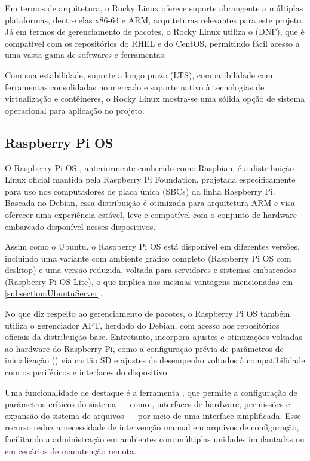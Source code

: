 Em termos de arquitetura, o Rocky Linux oferece suporte abrangente a múltiplas plataformas, dentre elas x86-64 e ARM, arquiteturas relevantes para este projeto. Já em termos de gerenciamento de pacotes, o Rocky Linux utiliza o  (DNF), que é compatível com os repositórios do RHEL e do CentOS, permitindo fácil acesso a uma vasta gama de softwares e ferramentas.

Com sua estabilidade, suporte a longo prazo (LTS), compatibilidade com ferramentas consolidadas no mercado e suporte nativo à tecnologias de virtualização e contêineres, o Rocky Linux mostra-se uma sólida opção de sistema operacional para aplicação no projeto.

\subsection{Raspberry Pi OS}
\label{subsection:RaspberryPiOS}

O Raspberry Pi OS \citep{raspisftwr2025}, anteriormente conhecido como Raspbian, é a distribuição Linux oficial mantida pela Raspberry Pi Foundation, projetada especificamente para uso nos computadores de placa única (SBCs) da linha Raspberry Pi. Baseada no Debian, essa distribuição é otimizada para arquitetura ARM e visa oferecer uma experiência estável, leve e compatível com o conjunto de hardware embarcado disponível nesses dispositivos.

Assim como o Ubuntu, o Raspberry Pi OS está disponível em diferentes versões, incluindo uma variante com ambiente gráfico completo (Raspberry Pi OS com desktop) e uma versão reduzida, voltada para servidores e sistemas embarcados (Raspberry Pi OS Lite), o que implica nas mesmas vantagens mencionadas em \ref{subsection:UbuntuServer}.

No que diz respeito ao gerenciamento de pacotes, o Raspberry Pi OS também utiliza o gerenciador APT, herdado do Debian, com acesso aos repositórios oficiais da distribuição base. Entretanto, incorpora ajustes e otimizações voltadas ao hardware do Raspberry Pi, como a configuração prévia de parâmetros de inicialização () via cartão SD e ajustes de desempenho voltados à compatibilidade com os periféricos e interfaces do dispositivo.

Uma funcionalidade de destaque é a ferramenta , que permite a configuração de parâmetros críticos do sistema --- como , interfaces de hardware, permissões e expansão do sistema de arquivos --- por meio de uma interface simplificada. Esse recurso reduz a necessidade de intervenção manual em arquivos de configuração, facilitando a administração em ambientes com múltiplas unidades implantadas ou em cenários de manutenção remota.

